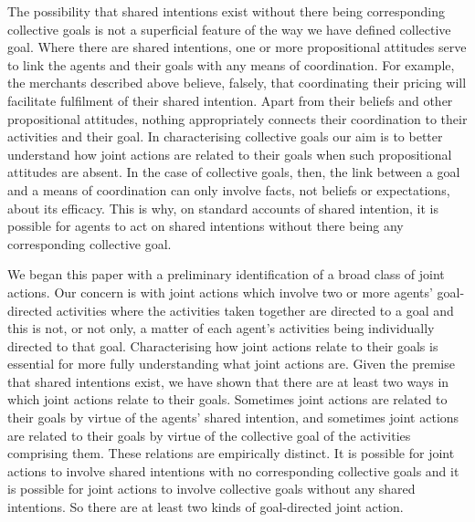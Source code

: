 \documentclass[12pt,a4paper]{extarticle}
\begin{document}
The possibility that shared intentions exist without there being corresponding collective goals is not a superficial feature of the way we have defined collective goal.  
Where there are shared intentions, one or more propositional attitudes serve to link the agents and their goals with any  means of coordination.  
For example, the merchants described above believe, falsely, that coordinating their pricing will facilitate fulfilment of their shared intention.  
Apart from their beliefs and other propositional attitudes, nothing appropriately connects their coordination to their activities and their goal.
In characterising collective goals our aim is to better understand how joint actions are related to their goals when such propositional attitudes are absent.  
In the case of collective goals, then, the link between a goal and a means of coordination can only involve facts, not beliefs or expectations, about its efficacy.
This is why, on standard accounts of shared intention, it is possible for agents to act on shared intentions without there being any corresponding collective goal.  

We began this paper with a preliminary identification of a broad class of joint actions.  
Our concern is with joint actions 
	which involve two or more agents' goal-directed activities 
		where the activities taken together are directed to a goal and this is not, or not only, a matter of each agent's activities being individually directed to that goal.
Characterising how joint actions relate to their goals is essential for more fully understanding what joint actions are.
Given the premise that shared intentions exist, we have shown that there are at least two ways in which joint actions relate to their goals.
Sometimes joint actions are related to their goals by virtue of the agents' shared intention, and sometimes joint actions are related to their goals by virtue of the collective goal of the activities comprising them.  
These relations are empirically distinct.  
It is possible for joint actions to involve shared intentions with no corresponding collective goals and it is possible for joint actions to involve collective goals without any shared intentions.
So there are at least two kinds of goal-directed joint action.
\end{document}
